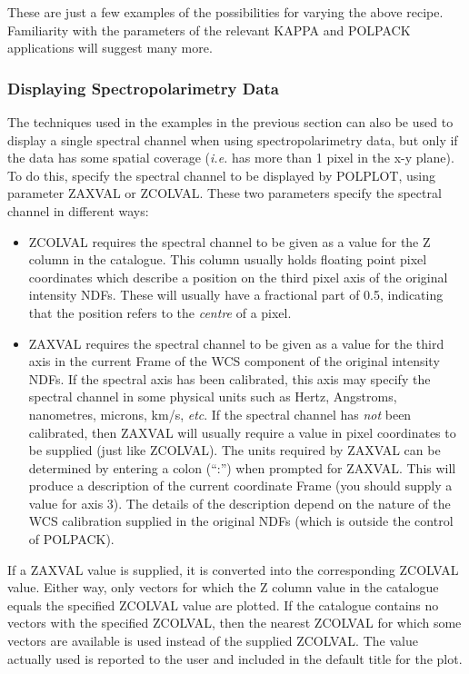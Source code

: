 \documentclass[twoside,11pt]{starlink}
\begin{document}
These are just a few examples of the possibilities for varying the above
recipe. Familiarity with the parameters of the relevant KAPPA and POLPACK
applications will suggest many more.

\subsubsection{\label{SEC:SPECDISP}Displaying Spectropolarimetry Data}
The techniques used in the examples in the previous section can also be
used to display a single spectral channel when using spectropolarimetry
data, but only if the data has some spatial coverage (\emph{i.e.} has
more than 1 pixel in the x-y plane). To do this, specify the spectral
channel to be displayed by POLPLOT, using parameter ZAXVAL or
ZCOLVAL. These two parameters specify the spectral channel in different
ways:

\begin{itemize}

\item ZCOLVAL requires the spectral channel to be given as a value for
the Z column in the catalogue. This column usually holds floating point
pixel coordinates which describe a position on the third pixel axis of
the original intensity NDFs. These will usually have a fractional part of
0.5, indicating that the position refers to the \emph{centre} of a pixel.

\item ZAXVAL requires the spectral channel to be given as a value for the
third axis in the current Frame of the WCS component of the original
intensity NDFs. If the spectral axis has been calibrated, this axis may
specify the spectral channel in some physical units such as Hertz,
Angstroms, nanometres, microns, km/s, \emph{etc}. If the spectral channel
has \emph{not} been calibrated, then ZAXVAL will usually require a value
in pixel coordinates to be supplied (just like ZCOLVAL). The units
required by ZAXVAL can be determined by entering a colon (``:'') when
prompted for ZAXVAL. This will produce a description of the current
coordinate Frame (you should supply a value for axis 3). The details of
the description depend on the nature of the WCS calibration supplied in
the original NDFs (which is outside the control of POLPACK).

\end{itemize}

If a ZAXVAL value is supplied, it is converted into the corresponding
ZCOLVAL value. Either way, only vectors for which the Z column value
in the catalogue equals the specified ZCOLVAL value are plotted. If
the catalogue contains no vectors with the specified ZCOLVAL, then the
nearest ZCOLVAL for which some vectors are available is used instead of
the supplied ZCOLVAL. The value actually used is reported to the user
and included in the default title for the plot.
\end{document}
